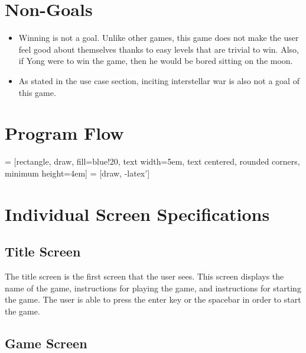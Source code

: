 \documentclass[margin,letterpaper,11pt]{scrartcl}
\begin{document}
\section{Non-Goals}

\begin{itemize}
   \item Winning is not a goal. Unlike other games, this game does not make
      the user feel good about themselves thanks to easy levels that are
      trivial to win.  Also, if Yong were to win the game, then he would be
      bored sitting on the moon.
   \item As stated in the use case section, inciting interstellar war is also
      not a goal of this game.
\end{itemize}

\section{Program Flow}

\usetikzlibrary{shapes,arrows}

 = [rectangle, draw, fill=blue!20,
    text width=5em, text centered, rounded corners, minimum height=4em]
 = [draw, -latex']


\section{Individual Screen Specifications}

\subsection{Title Screen}

The title screen is the first screen that the user sees. This screen displays
the name of the game, instructions for playing the game, and instructions for
starting the game. The user is able to press the enter key or the spacebar in
order to start the game.

\subsection{Game Screen}
\end{document}
